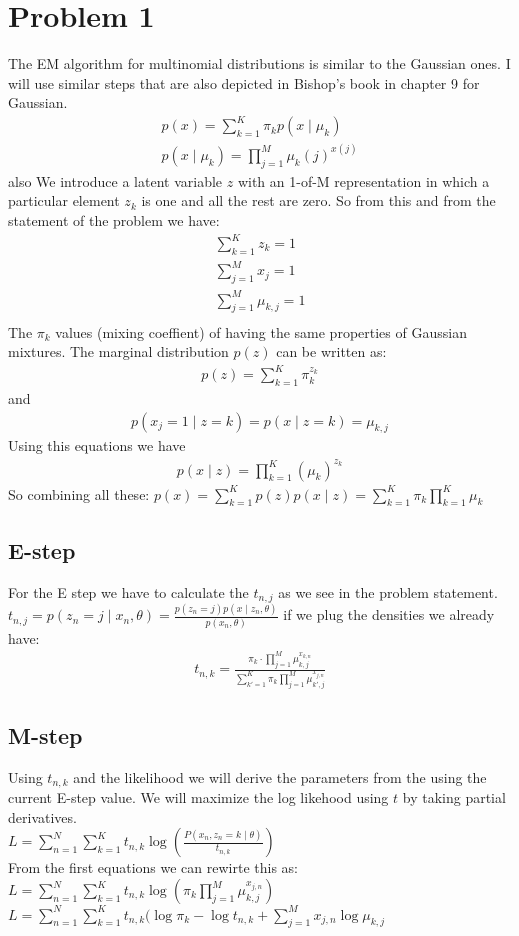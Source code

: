 \section*{Problem 1}
The EM algorithm for multinomial distributions is similar to the Gaussian ones.
I will use similar steps that are also depicted in Bishop's book in chapter 9 for
Gaussian.
\begin{align*}
p(x) = \sum_{k=1}^K \pi_k p(x \mid \mu_k)\\
p(x \mid \mu_k) = \prod_{j=1}^M \mu_k (j)^{x(j)}
\end{align*}
also
We introduce a latent variable $z$ with an 1-of-M representation 
in which a particular element $z_k$ is one and all the rest are zero.
So from this and from the statement of the problem we have:
\begin{align*}
\sum_{k=1}^K z_k =1\\
\sum_{j=1}^M x_j =1\\
\sum_{j=1}^M \mu_{k,j} =1\\
\end{align*}
The $\pi_k$ values (mixing coeffient) of having the same properties of Gaussian mixtures.
The marginal distribution $p(z)$ can be written as:
\begin{align*}
p(z) = \sum_{k=1}^K \pi_{k}^{z_k}
\end{align*}
and
\begin{align*}
p(x_j =1 \mid z=k) = p(x\mid z=k) = \mu_{k,j}
\end{align*}
Using this equations we have 
\begin{align*}
p(x\mid z) = \prod_{k=1}^K (\mu_{k})^{z_{k}}
\end{align*}
So combining all these:
$p(x) = \sum_{k=1}^K p(z)p(x\mid z) = \sum_{k=1}^K \pi_k\prod_{k=1}^K \mu_k$
\subsection*{E-step}
For the E step we have to calculate the $t_{n,j}$ as we see in the problem statement.
$t_{n,j}=p(z_n =j \mid x_n,\theta) = \frac{p(z_n =j)p(x\mid z_n,\theta)}{p(x_n,\theta)}$
if we plug the densities we already have:
\begin{align*}
t_{n,k} = \frac{\pi_k \cdot\prod_{j=1}^M \mu_{k,j}^{x_{k,n}}}{\sum_{k'=1}^K \pi_k \prod_{j=1}^M \mu_{k',j}^{x_{j,n}}}
\end{align*}
\subsection*{M-step}
Using $t_{n,k}$ and the likelihood we will derive the parameters from the using the current E-step value.
We will maximize the log likehood using $t$ by taking partial derivatives.\\
$L = \sum_{n=1}^N\sum_{k=1}^K t_{n,k}\log(\frac{P(x_n,z_n=k\mid\theta)}{t_{n,k}})$\\
From the first equations we can rewirte this as:\\
$L = \sum_{n=1}^N\sum_{k=1}^K t_{n,k}\log( \pi_{k} \prod_{j=1}^M \mu_{k,j}^{x_{j,n}})$\\
$L = \sum_{n=1}^N\sum_{k=1}^K t_{n,k}(\log \pi_{k} - \log t_{n,k} + \sum_{j=1}^M x_{j,n}\log\mu_{k,j}$\\

